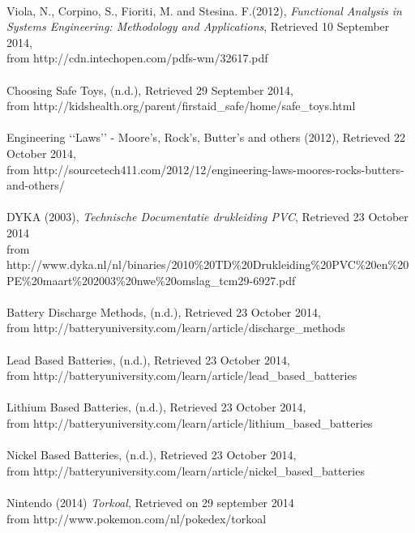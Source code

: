 \documentclass[11pt,twoside,a4paper]{report}
\begin{document}
\\
Viola, N., Corpino, S., Fioriti, M. and Stesina. F.(2012), \textit{Functional Analysis in Systems Engineering: Methodology and Applications}, Retrieved 10 September 2014, \\from http://cdn.intechopen.com/pdfs-wm/32617.pdf \\
\\
Choosing Safe Toys, (n.d.), Retrieved 29 September 2014, \\from http://kidshealth.org/parent/firstaid\_safe/home/safe\_toys.html \\
\\
Engineering \lq\lq{}Laws\rq\rq{} - Moore\rq{}s, Rock\rq{}s, Butter\rq{}s and others (2012), Retrieved 22 October 2014, \\from http://sourcetech411.com/2012/12/engineering-laws-moores-rocks-butters-and-others/ \\
\\
DYKA (2003), \textit{Technische Documentatie drukleiding PVC}, Retrieved 23 October 2014 \\
from http://www.dyka.nl/nl/binaries/2010\%20TD\%20Drukleiding\%20PVC\%20en\%20PE\%20maart\%202003\%20nwe\%20omslag\_tcm29-6927.pdf \\
\\
Battery Discharge Methods, (n.d.), Retrieved 23 October 2014, \\from http://batteryuniversity.com/learn/article/discharge\_methods\\
\\
Lead Based Batteries, (n.d.), Retrieved 23 October 2014, \\from http://batteryuniversity.com/learn/article/lead\_based\_batteries \\
\\
Lithium Based Batteries, (n.d.), Retrieved 23 October 2014, \\from http://batteryuniversity.com/learn/article/lithium\_based\_batteries \\
\\
Nickel Based Batteries, (n.d.), Retrieved 23 October 2014, \\from 
http://batteryuniversity.com/learn/article/nickel\_based\_batteries \\
\\
Nintendo (2014) \textit{Torkoal}, Retrieved on 29 september 2014\\ from http://www.pokemon.com/nl/pokedex/torkoal \\
\\
\end{document}
